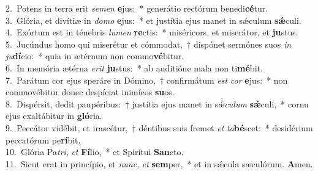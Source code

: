 {2.~}Potens in terra erit \textit{se}\textit{men} \textbf{e}jus:~* generátio rectórum benedi\textbf{cé}tur.\\
{3.~}Glória, et divítiæ in \textit{do}\textit{mo} \textbf{e}jus:~* et justítia ejus manet in sǽculum \textbf{sǽ}culi.\\
{4.~}Exórtum est in ténebris \textit{lu}\textit{men} \textbf{re}ctis:~* miséricors, et miserátor, et \textbf{ju}stus.\\
{5.~}Jucúndus homo qui miserétur et cómmodat,~† dispónet sermónes suos \textit{in} \textit{ju}\textbf{dí}cio:~* quia in ætérnum non commo\textbf{vé}bitur.\\
{6.~}In memória ætérna \textit{e}\textit{rit} \textbf{ju}stus:~* ab auditióne mala non ti\textbf{mé}bit.\\
{7.~}Parátum cor ejus speráre in Dómino,~† confirmátum \textit{est} \textit{cor} \textbf{e}jus:~* non commovébitur donec despíciat inimícos \textbf{su}os.\\
{8.~}Dispérsit, dedit paupéribus:~† justítia ejus manet in sǽ\textit{cu}\textit{lum} \textbf{sǽ}culi,~* cornu ejus exaltábitur in \textbf{gló}ria.\\
{9.~}Peccátor vidébit, et irascétur,~† déntibus suis fremet \textit{et} \textit{ta}\textbf{bé}scet:~* desidérium peccatórum pe\textbf{rí}bit.\\
{10.~}Glória Pa\textit{tri}, \textit{et} \textbf{Fí}lio,~* et Spirítui \textbf{San}cto.\\
{11.~}Sicut erat in princípio, et \textit{nunc}, \textit{et} \textbf{sem}per,~* et in sǽcula sæculórum. \textbf{A}men.\\
